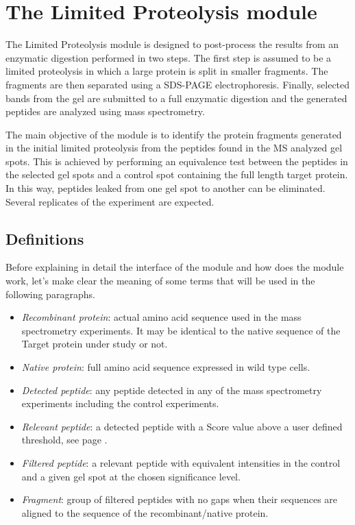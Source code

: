 \chapter{The Limited Proteolysis module}
\label{chap:limprot}

The Limited Proteolysis module is designed to post-process the results from an enzymatic
digestion performed in two steps. The first step is assumed to be a limited proteolysis
in which a large protein is split in smaller fragments. The fragments are then separated
using a SDS-PAGE electrophoresis. Finally, selected bands from the gel are submitted to
a full enzymatic digestion and the generated peptides are analyzed using mass spectrometry.

The main objective of the module is to identify the protein fragments generated in
the initial limited proteolysis from the peptides found in the MS analyzed gel spots.
This is achieved by performing an equivalence test\cite{Limentani2005} between the
peptides in the selected gel spots and a control spot containing the full length
target protein. In this way, peptides leaked from one gel spot to another can be
eliminated. Several replicates of the experiment are expected.

\section{Definitions}
\label{sec:limprotDefinitions}

Before explaining in detail the interface of the module and how does the module
work, let's make clear the meaning of some terms that will be used in the following
paragraphs.

\begin{itemize}
    \item \textit{Recombinant protein}: actual amino acid sequence used in the mass
    spectrometry experiments. It may be identical to the native sequence of the Target
    protein under study or not.
    \item \textit{Native protein}: full amino acid sequence expressed in wild type cells.
    \item \textit{Detected peptide}: any peptide detected in any of the mass spectrometry
    experiments including the control experiments.
    \item \textit{Relevant peptide}: a detected peptide with a Score value above
    a user defined threshold, see page \pageref{par:limprotScoreValue}.
    \item \textit{Filtered peptide}: a relevant peptide with equivalent intensities
    in the control and a given gel spot at the chosen significance level.\label{par:limprotFP}
    \item \textit{Fragment}: group of filtered peptides with no gaps when their
    sequences are aligned to the sequence of the recombinant/native protein.
\end{itemize}

